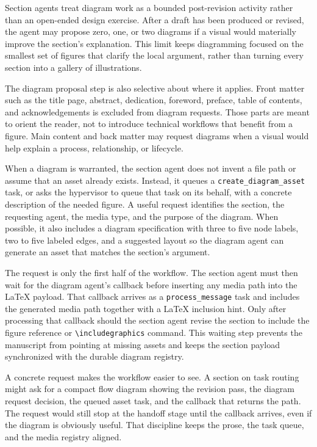 Section agents treat diagram work as a bounded post-revision activity rather than an open-ended design exercise. After a draft has been produced or revised, the agent may propose zero, one, or two diagrams if a visual would materially improve the section's explanation. This limit keeps diagramming focused on the smallest set of figures that clarify the local argument, rather than turning every section into a gallery of illustrations.

The diagram proposal step is also selective about where it applies. Front matter such as the title page, abstract, dedication, foreword, preface, table of contents, and acknowledgements is excluded from diagram requests. Those parts are meant to orient the reader, not to introduce technical workflows that benefit from a figure. Main content and back matter may request diagrams when a visual would help explain a process, relationship, or lifecycle.

When a diagram is warranted, the section agent does not invent a file path or assume that an asset already exists. Instead, it queues a \texttt{create\_diagram\_asset} task, or asks the hypervisor to queue that task on its behalf, with a concrete description of the needed figure. A useful request identifies the section, the requesting agent, the media type, and the purpose of the diagram. When possible, it also includes a diagram specification with three to five node labels, two to five labeled edges, and a suggested layout so the diagram agent can generate an asset that matches the section's argument.

The request is only the first half of the workflow. The section agent must then wait for the diagram agent's callback before inserting any media path into the \LaTeX{} payload. That callback arrives as a \texttt{process\_message} task and includes the generated media path together with a \LaTeX{} inclusion hint. Only after processing that callback should the section agent revise the section to include the figure reference or \texttt{\textbackslash includegraphics} command. This waiting step prevents the manuscript from pointing at missing assets and keeps the section payload synchronized with the durable diagram registry.

A concrete request makes the workflow easier to see. A section on task routing might ask for a compact flow diagram showing the revision pass, the diagram request decision, the queued asset task, and the callback that returns the path. The request would still stop at the handoff stage until the callback arrives, even if the diagram is obviously useful. That discipline keeps the prose, the task queue, and the media registry aligned.

